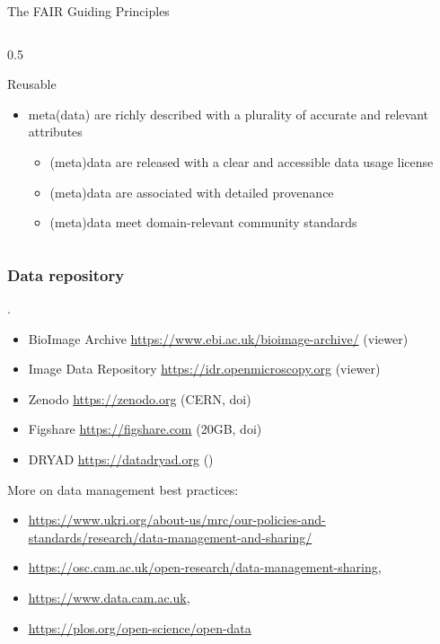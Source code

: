 \documentclass[ignorenonframetext,aspectratio=169,10pt,xcolor=table]{beamer}
\begin{document}
\begin{frame}{The FAIR Guiding Principles}
\begin{columns}
\begin{column}{0.5\textwidth}
      \begin{block}{Reusable}
        \begin{itemize}
          \item meta(data) are richly described with a plurality of accurate and relevant attributes
                \begin{itemize}  \scriptsize
                  \item (meta)data are released with a clear and accessible data usage license
                  \item (meta)data are associated with detailed provenance
                  \item (meta)data meet domain-relevant community standards
                \end{itemize}
        \end{itemize}
      \end{block}
    \end{column}
  \end{columns}

\end{frame}


\begin{frame} \frametitle{Data repository}

  .
  \begin{itemize}
    \item BioImage Archive \url{https://www.ebi.ac.uk/bioimage-archive/} (viewer)
    \item Image Data Repository \url{https://idr.openmicroscopy.org} (viewer)
    \item Zenodo \url{https://zenodo.org} (CERN, doi)
    \item Figshare \url{https://figshare.com} (20GB, doi)
    \item DRYAD \url{https://datadryad.org} ()
  \end{itemize}

  More on data management best practices:
  \begin{itemize}
    \item \url{https://www.ukri.org/about-us/mrc/our-policies-and-standards/research/data-management-and-sharing/}
    \item \url{https://osc.cam.ac.uk/open-research/data-management-sharing},
    \item \url{https://www.data.cam.ac.uk},
    \item \url{https://plos.org/open-science/open-data}
  \end{itemize}


\end{frame}
\end{document}

